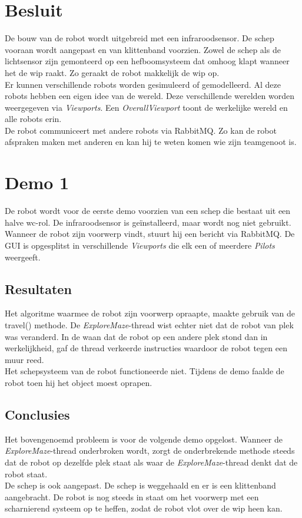 \documentclass[tt2]{penoverslag}
\begin{document}
\section{Besluit}
\label{sec:Besluit}
De bouw van de robot wordt uitgebreid met een infraroodsensor. De schep vooraan wordt aangepast en van klittenband voorzien. Zowel de schep als de lichtsensor zijn gemonteerd op een hefboomsysteem dat omhoog klapt wanneer het de wip raakt. Zo geraakt de robot makkelijk de wip op.\\

Er kunnen verschillende robots worden gesimuleerd of gemodelleerd. Al deze robots hebben een eigen idee van de wereld. Deze verschillende werelden worden weergegeven via \textit{Viewports}. Een \textit{OverallViewport} toont de werkelijke wereld en alle robots erin.\\

De robot communiceert met andere robots via RabbitMQ. Zo kan de robot afspraken maken met anderen en kan hij te weten komen wie zijn teamgenoot is.


\newpage
\makeappendix

\section{Demo 1} %
\label{Asec:demo1}
De robot wordt voor de eerste demo voorzien van een schep die bestaat uit een halve wc-rol. De infraroodsensor is ge\"installeerd, maar wordt nog niet gebruikt. Wanneer de robot zijn voorwerp vindt, stuurt hij een bericht via RabbitMQ. De GUI is opgesplitst in verschillende \textit{Viewports} die elk een of meerdere \textit{Pilots} weergeeft.

\subsection{Resultaten} %
\label{Assec:result1}
Het algoritme waarmee de robot zijn voorwerp opraapte, maakte gebruik van de travel() methode. De \textit{ExploreMaze}-thread wist echter niet dat de robot van plek was veranderd. In de waan dat de robot op een andere plek stond dan in werkelijkheid, gaf de thread verkeerde instructies waardoor de robot tegen een muur reed. \\
Het schepsysteem van de robot functioneerde niet. Tijdens de demo faalde de robot toen hij het object moest oprapen. 

\subsection{Conclusies} %
\label{Assec:conc1}
Het bovengenoemd probleem is voor de volgende demo opgelost. Wanneer de \textit{ExploreMaze}-thread onderbroken wordt, zorgt de onderbrekende methode steeds dat de robot op dezelfde plek staat als waar de \textit{ExploreMaze}-thread denkt dat de robot staat.\\
De schep is ook aangepast. De schep is weggehaald en er is een klittenband aangebracht. De robot is nog steeds in staat om het voorwerp met een scharnierend systeem op te heffen, zodat de robot vlot over de wip heen kan.
\end{document}
